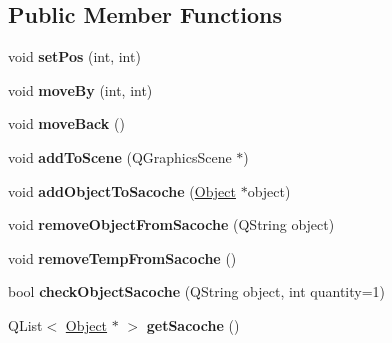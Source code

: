 \subsection*{Public Member Functions}
\begin{DoxyCompactItemize}
\item 
\hypertarget{class_pingouin_a91f0120d2ee61c6a6ca715a8e88f3d3b}{}void {\bfseries set\+Pos} (int, int)\label{class_pingouin_a91f0120d2ee61c6a6ca715a8e88f3d3b}

\item 
\hypertarget{class_pingouin_a80aa8b486de1bba6c637a8ab0233fc10}{}void {\bfseries move\+By} (int, int)\label{class_pingouin_a80aa8b486de1bba6c637a8ab0233fc10}

\item 
\hypertarget{class_pingouin_a6b74f3acac4cce611992586356805d4a}{}void {\bfseries move\+Back} ()\label{class_pingouin_a6b74f3acac4cce611992586356805d4a}

\item 
\hypertarget{class_pingouin_a90eef5bc5b47bdae1508f572d1d898d5}{}void {\bfseries add\+To\+Scene} (Q\+Graphics\+Scene $\ast$)\label{class_pingouin_a90eef5bc5b47bdae1508f572d1d898d5}

\item 
\hypertarget{class_pingouin_ad91b21a996f75e32a78c203eb7490446}{}void {\bfseries add\+Object\+To\+Sacoche} (\hyperlink{class_object}{Object} $\ast$object)\label{class_pingouin_ad91b21a996f75e32a78c203eb7490446}

\item 
\hypertarget{class_pingouin_a73130bc706f0c1a40a20f05d0d3a3ffa}{}void {\bfseries remove\+Object\+From\+Sacoche} (Q\+String object)\label{class_pingouin_a73130bc706f0c1a40a20f05d0d3a3ffa}

\item 
\hypertarget{class_pingouin_a7bc2b0b92b4093f59821a683e6d71b14}{}void {\bfseries remove\+Temp\+From\+Sacoche} ()\label{class_pingouin_a7bc2b0b92b4093f59821a683e6d71b14}

\item 
\hypertarget{class_pingouin_a53145c212327b2a733237e1eb55aad24}{}bool {\bfseries check\+Object\+Sacoche} (Q\+String object, int quantity=1)\label{class_pingouin_a53145c212327b2a733237e1eb55aad24}

\item 
\hypertarget{class_pingouin_aa5ed410fe91fcdf598b00baf4c33354f}{}Q\+List$<$ \hyperlink{class_object}{Object} $\ast$ $>$ {\bfseries get\+Sacoche} ()\label{class_pingouin_aa5ed410fe91fcdf598b00baf4c33354f}


\end{DoxyCompactItemize}
